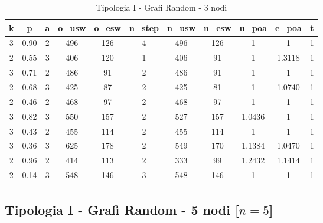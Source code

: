 \begin{table}[H]
\centering
\scalebox{0.9} {
\begin{tabular}{|c|c|c|c|c|c|c|c|c|c|c|}
\hline
\textbf{k} & \textbf{p} & \textbf{a} & \textbf{o\_usw} & \textbf{o\_esw} & \textbf{n\_step} & \textbf{n\_usw} & \textbf{n\_esw} & \textbf{u\_poa} & \textbf{e\_poa} & \textbf{t} \\ \hline
3 & 0.90 & 2 & 496 & 126 & 4 & 496 & 126 & 1 & 1 & 1 \\ \hline
2 & 0.55 & 3 & 406 & 120 & 1 & 406 & 91 & 1 & 1.3118 & 1 \\ \hline
3 & 0.71 & 2 & 486 & 91 & 2 & 486 & 91 & 1 & 1 & 1 \\ \hline
2 & 0.68 & 3 & 425 & 87 & 2 & 425 & 81 & 1 & 1.0740 & 1 \\ \hline
2 & 0.46 & 2 & 468 & 97 & 2 & 468 & 97 & 1 & 1 & 1 \\ \hline
3 & 0.82 & 3 & 550 & 157 & 2 & 527 & 157 & 1.0436 & 1 & 1 \\ \hline
3 & 0.43 & 2 & 455 & 114 & 2 & 455 & 114 & 1 & 1 & 1 \\ \hline
3 & 0.36 & 3 & 625 & 178 & 2 & 549 & 170 & 1.1384 & 1.0470 & 1 \\ \hline
2 & 0.96 & 2 & 414 & 113 & 2 & 333 & 99 & 1.2432 & 1.1414 & 1 \\ \hline
2 & 0.14 & 3 & 548 & 146 & 3 & 548 & 146 & 1 & 1 & 1 \\ \hline
\end{tabular}
}
\caption{Tipologia I - Grafi Random - 3 nodi}
\label{tab:sperimentazione-tipo1-3nodi}
\end{table}

\subsection{Tipologia I - Grafi Random - 5 nodi [$n=5$]}


